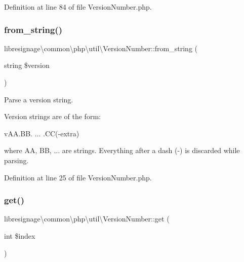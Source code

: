 Definition at line 84 of file Version\+Number.\+php.

\mbox{\label{classlibresignage_1_1common_1_1php_1_1util_1_1VersionNumber_a1204dc3fcac672c22a03b252f46539ed}} 
\subsubsection{\texorpdfstring{from\+\_\+string()}{from\_string()}}
{\footnotesize\ttfamily libresignage\textbackslash{}common\textbackslash{}php\textbackslash{}util\textbackslash{}\+Version\+Number\+::from\+\_\+string (\begin{DoxyParamCaption}\item[{string}]{\$version }\end{DoxyParamCaption})}

Parse a version string.

Version strings are of the form\+:

v\+A\+A.\+BB. ... .CC(-\/extra)

where AA, BB, ... are strings. Everything after a dash (-\/) is discarded while parsing. 

Definition at line 25 of file Version\+Number.\+php.

\mbox{\label{classlibresignage_1_1common_1_1php_1_1util_1_1VersionNumber_a8f0de766123efc0ad42703e06c0dbc4c}} 
\subsubsection{\texorpdfstring{get()}{get()}}
{\footnotesize\ttfamily libresignage\textbackslash{}common\textbackslash{}php\textbackslash{}util\textbackslash{}\+Version\+Number\+::get (\begin{DoxyParamCaption}\item[{int}]{\$index }\end{DoxyParamCaption})}

